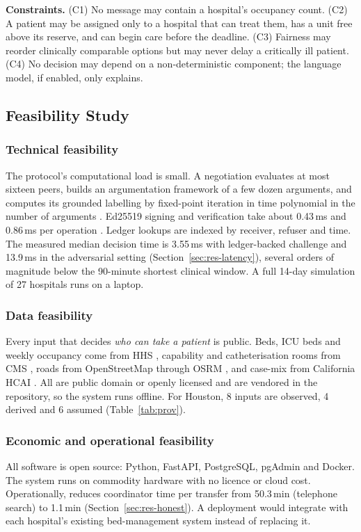 \textbf{Constraints.} (C1) No message may contain a hospital's occupancy count. (C2) A patient may be assigned only to a hospital that can treat them, has a unit free above its reserve, and can begin care before the deadline. (C3) Fairness may reorder clinically comparable options but may never delay a critically ill patient. (C4) No decision may depend on a non-deterministic component; the language model, if enabled, only explains.

\subsection{Feasibility Study}
\subsubsection{Technical feasibility}
The protocol's computational load is small. A negotiation evaluates at most sixteen peers, builds an argumentation framework of a few dozen arguments, and computes its grounded labelling by fixed-point iteration in time polynomial in the number of arguments \cite{modgil2009algorithms}. Ed25519 signing and verification take about 0.43\,ms and 0.86\,ms per operation \cite{bernstein2012ed25519}. Ledger lookups are indexed by receiver, refuser and time. The measured median decision time is 3.55\,ms with ledger-backed challenge and 13.9\,ms in the adversarial setting (Section~\ref{sec:res-latency}), several orders of magnitude below the 90-minute shortest clinical window. A full 14-day simulation of 27 hospitals runs on a laptop.

\subsubsection{Data feasibility}
Every input that decides \emph{who can take a patient} is public. Beds, ICU beds and weekly occupancy come from HHS \cite{hhs_capacity_dataset}, capability and catheterisation rooms from CMS \cite{cms_pos}, roads from OpenStreetMap through OSRM \cite{luxen2011osrm}, and case-mix from California HCAI \cite{hcai_transfers}. All are public domain or openly licensed and are vendored in the repository, so the system runs offline. For Houston, 8 inputs are observed, 4 derived and 6 assumed (Table~\ref{tab:prov}).

\subsubsection{Economic and operational feasibility}
All software is open source: Python, FastAPI, PostgreSQL, pgAdmin and Docker. The system runs on commodity hardware with no licence or cloud cost. Operationally, \mahros{} reduces coordinator time per transfer from 50.3\,min (telephone search) to 1.1\,min (Section~\ref{sec:res-honest}). A deployment would integrate with each hospital's existing bed-management system instead of replacing it.

